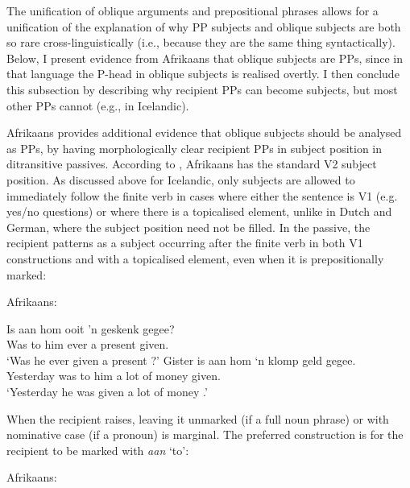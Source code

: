 The unification of oblique arguments and prepositional phrases allows for a unification of the explanation of why PP subjects and oblique subjects are both so rare cross-linguistically (i.e., because they are the same thing syntactically). Below, I present evidence from Afrikaans that oblique subjects are PPs, since in that language the P-head in oblique subjects is realised overtly. I then conclude this subsection by describing why recipient PPs can become subjects, but most other PPs cannot (e.g., in Icelandic).

Afrikaans provides additional evidence that oblique subjects should be analysed as PPs, by having morphologically clear recipient PPs in subject position in ditransitive passives. According to \cite{Stadler.1996}, Afrikaans has the standard V2 subject position. As discussed above for Icelandic, only subjects are allowed to immediately follow the finite verb in cases where either the sentence is V1 (e.g. yes/no questions) or where there is a topicalised element, unlike in Dutch and German, where the subject position need not be filled. In the passive, the recipient patterns as a subject occurring after the finite verb in both V1 constructions and with a topicalised element, even when it is prepositionally marked:
\begin{exe}
	\ex Afrikaans: \label{ex:af-rec-pass1}
\begin{xlist}
\ex \gll Is aan hom ooit 'n geskenk gegee?\\
Was to him ever a present given.\\
\trans `Was he ever given a present \citep[ex. 49]{Stadler.1996}?'
\ex \gll Gister is aan hom `n klomp geld gegee.\\
Yesterday was to him a {lot of} money given.\\
\trans `Yesterday he was given a lot of money \citep[ex. 50]{Stadler.1996}.'
\end{xlist}
\end{exe}

When the recipient raises, leaving it unmarked (if a full noun phrase) or with nominative case (if a pronoun) is marginal. The preferred construction is for the recipient to be marked with \emph{aan} `to':

\begin{exe}
	\ex Afrikaans: \label{ex:af-rec-pass2}
\begin{xlist}
\end{xlist}
\end{exe}

